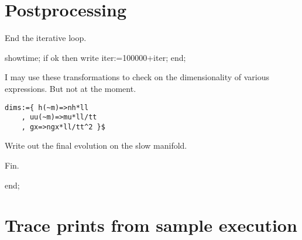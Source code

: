 \documentclass[12pt,a5paper]{article}
\begin{document}
\section{Postprocessing}

End the iterative loop.
\begin{reduce}
showtime;
if ok then write iter:=100000+iter;
end;
\end{reduce}

I may use these transformations to check on the dimensionality of various expressions.  But not at the moment.

\begin{verbatim}
dims:={ h(~m)=>nh*ll
    , uu(~m)=>mu*ll/tt
    , gx=>ngx*ll/tt^2 }$    
\end{verbatim}

Write out the final evolution on the slow manifold.



Fin.\begin{reduce}end;\end{reduce}


\appendix
\section{Trace prints from sample execution}
\end{document}
